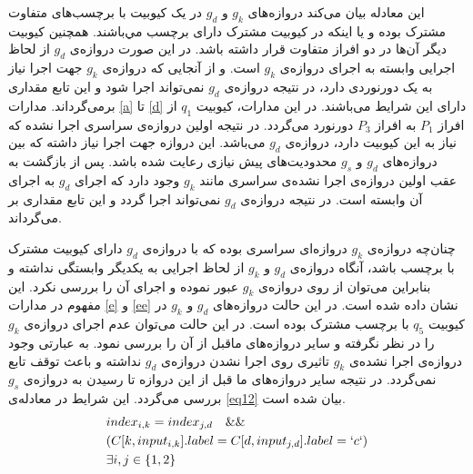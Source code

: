 \begin{itemize}
این معادله بیان می‌کند دروازه‌های $g_{k}$ و $g_{d}$ در یک کیوبیت با برچسب‌های متفاوت مشترک بوده و یا اینکه در کیوبیت مشترک دارای برچسب  مي‌باشند. همچنین کیوبیت دیگر آن‌ها در دو افراز متفاوت قرار داشته باشد. در این صورت دروازه‌ی $g_{d}$ از لحاظ اجرایی وابسته به اجرای دروازه‌ی $g_{k}$ است. و از آنجایی که دروازه‌ی $g_{k}$ جهت اجرا نیاز به یک دورنوردی دارد، در نتیجه دروازه‌‌ی $g_{d}$ نمی‌تواند اجرا شود و این تابع مقداری  برمی‌گرداند. مدارات \ref{a} تا \ref{d} دارای این شرایط می‌باشند. در این مدارات، کیوبیت $q_{1}$ از افراز $P_{1}$ به افراز $P_{3}$ دورنورد می‌گردد. در نتیجه اولین دروازه‌ی سراسری اجرا نشده که نیاز به این کیوبیت دارد، دروازه‌ی $g_{d}$ می‌باشد. این دروازه جهت اجرا نیاز داشته که بین دروازه‌های $g_{d}$ و $g_{s}$ محدودیت‌های پیش نیازی رعایت شده باشد. پس از بازگشت به عقب اولین دروازه‌ی اجرا نشده‌ی سراسری مانند $g_{k}$ وجود دارد که اجرای $g_{d}$ به اجرای آن وابسته است. در نتیجه دروازه‌ی $g_{d}$ نمی‌تواند اجرا گردد و این تابع مقداری  بر می‌گرداند.

چنان‌چه دروازه‌‌ی $g_{k}$ دروازه‌‌ای سراسری بوده که با دروازه‌ی $g_{d}$ دارای کیوبیت مشترک با برچسب  باشد، آنگاه دروازه‌ی $g_d$ و $g_k$ از لحاظ اجرایی به یکدیگر وابستگی نداشته و بنابراین می‌توان از روی دروازه‌ی $g_k$ عبور نموده و اجرای آن را بررسی نکرد. این مفهوم در مدارات \ref{e} و \ref{ee} نشان داده شده است. در این حالت دروازه‌های $g_d$ و $g_k$ در کیوبیت $q_5 $ با برچسب  مشترک بوده است. در این حالت می‌توان عدم اجرای دروازه‌ی $g_k$ را در نظر نگرفته و سایر دروازه‌های ماقبل از آن را بررسی نمود. به عبارتی وجود دروازه‌ی اجرا نشده‌ی $g_k$ تاثیری روی اجرا نشدن دروازه‌ی $g_d$ نداشته و باعث توقف تابع   نمی‌گردد. در نتیجه سایر دروازه‌های ما قبل از این دروازه تا رسیدن به دروازه‌ی $g_s$ بررسی می‌گردد. این شرایط در معادله‌ی \ref{eq12} بیان شده است.
\begin{equation}
\begin{split}
&index_{i,k}= index_{j,d}\quad \&\& \\ 
&({C[ {k,inpu{t_{i,k}}} ].label =C[{d,inpu{t_{j,d}}} ].label = `c`} ) \\
&\exists i,j \in\{1,2\}\\
\label{eq12}
\end{split}
\end{equation}

\begin{figure}[htbp]
\centering
{}
\end{figure}
\end{itemize}
